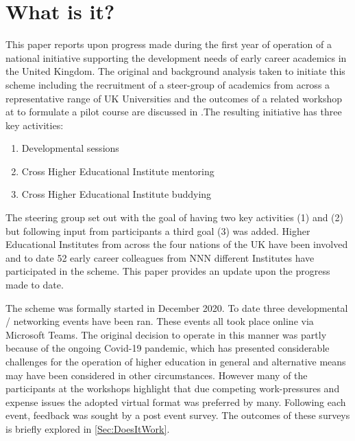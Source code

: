 \documentclass[sigconf]{acmart}
\begin{document}
\maketitle

\section{What is it?}	
\label{sec:What}
This paper reports upon progress made during the first year of operation of a national initiative supporting the development needs of early career academics in the United Kingdom. The original and background analysis taken to initiate this scheme including the recruitment of a steer-group of academics from across a representative range of UK Universities and the outcomes of a related workshop at  to formulate a pilot course are discussed in .The resulting initiative has three key activities: 

\begin{enumerate}
	\item Developmental sessions
	\item Cross Higher Educational Institute mentoring
	\item Cross Higher Educational Institute buddying
\end{enumerate}

The steering group set out with the goal of having two key activities (1) and (2) but following input from participants a third goal (3) was added. Higher Educational Institutes from across the four nations of the UK have been involved and to date 52 early career colleagues from NNN different Institutes have participated in the scheme. This paper provides an update upon the progress made to date.

The scheme was formally started in December 2020. To date three developmental / networking events have been ran. These events all took place online via Microsoft Teams. The original decision to operate in this manner was partly because of the ongoing Covid-19 pandemic, which has presented considerable challenges for the operation of higher education in general \cite{CrickCovidUK,CrickCovidAus2021,CrickCovidPoster} and alternative means may have been considered in other circumstances. However many of the participants at the workshops highlight that due competing work-pressures and expense issues the adopted virtual format was preferred by many. Following each event, feedback was sought by a post event survey. The outcomes of these surveys is briefly explored in \ref{Sec:DoesItWork}.
\end{document}

